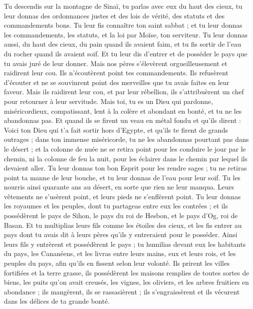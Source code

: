 \begin{multicols}{2}
Tu descendis sur la montagne de Sinaï, tu parlas avec eux du haut des cieux, tu leur donnas des ordonnances justes et des lois de vérité, des statuts et des commandements bons.
Tu leur fis connaître ton saint sabbat ; et tu leur donnas les commandements, les statuts, et la loi par Moïse, ton serviteur.
Tu leur donnas aussi, du haut des cieux, du pain quand ils avaient faim, et tu fis sortir de l'eau du rocher quand ils avaient soif. Et tu leur dis d'entrer et de posséder le pays que tu avais juré de leur donner.
Mais nos pères s'élevèrent orgueilleusement et raidirent leur cou. Ils n'écoutèrent point tes commandements.
Ils refusèrent d'écouter et ne se souvinrent point des merveilles que tu avais faites en leur faveur. Mais ils raidirent leur cou, et par leur rébellion, ils s'attribuèrent un chef pour retourner à leur servitude. Mais toi, tu es un Dieu qui pardonne, miséricordieux, compatissant, lent à la colère et abondant en bonté, et tu ne les abandonnas pas.
Et quand ils se firent un veau en métal fondu et qu'ils dirent : Voici ton Dieu qui t'a fait sortir hors d'Egypte, et qu'ils te firent de grands outrages ;
dans ton immense miséricorde, tu ne les abandonnas pourtant pas dans le désert ; et la colonne de nuée ne se retira point pour les conduire le jour par le chemin, ni la colonne de feu la nuit, pour les éclairer dans le chemin par lequel ils devaient aller.
Tu leur donnas ton bon Esprit pour les rendre sages ; tu ne retiras point ta manne de leur bouche, et tu leur donnas de l'eau pour leur soif.
Tu les nourris ainsi quarante ans au désert, en sorte que rien ne leur manqua. Leurs vêtements ne s'usèrent point, et leurs pieds ne s'enflèrent point.
Tu leur donnas les royaumes et les peuples, dont tu partageas entre eux les contrées ; et ils possédèrent le pays de Sihon, le pays du roi de Hesbon, et le pays d'Og, roi de Basan.
Et tu multiplias leurs fils comme les étoiles des cieux, et les fis entrer au pays dont tu avais dit à leurs pères qu'ils y entreraient pour le posséder.
Ainsi leurs fils y entrèrent et possédèrent le pays ; tu humilias devant eux les habitants du pays, les Cananéens, et les livras entre leurs mains, eux et leurs rois, et les peuples du pays, afin qu'ils en fissent selon leur volonté.
Ils prirent les villes fortifiées et la terre grasse, ils possédèrent les maisons remplies de toutes sortes de biens, les puits qu'on avait creusés, les vignes, les oliviers, et les arbres fruitiers en abondance ; ils mangèrent, ils se rassasièrent ; ils s'engraissèrent et ils vécurent dans les délices de ta grande bonté.

\end{multicols}

